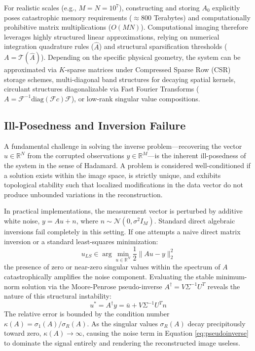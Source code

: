 For realistic scales (e.g., $M = N = 10^7$), constructing and storing $A_0$ explicitly poses catastrophic memory requirements ($\approx 800$ Terabytes) and computationally prohibitive matrix multiplications ($O(MN)$). Computational imaging therefore leverages highly structured linear approximations, relying on numerical integration quadrature rules ($\hat{A}$) and structural sparsification thresholds ($A = \mathcal{T}(\hat{A})$). Depending on the specific physical geometry, the system can be approximated via $K$-sparse matrices under Compressed Sparse Row (CSR) storage schemes, multi-diagonal band structures for decaying spatial kernels, circulant structures diagonalizable via Fast Fourier Transforms ($A = \mathcal{F}^{-1} \text{diag}(\mathcal{F}c)\mathcal{F}$), or low-rank singular value compositions.

\subsection{Ill-Posedness and Inversion Failure}
A fundamental challenge in solving the inverse problem—recovering the vector $u \in \mathbb{R}^N$ from the corrupted observations $y \in \mathbb{R}^M$—is the inherent ill-posedness of the system in the sense of Hadamard. A problem is considered well-conditioned if a solution exists within the image space, is strictly unique, and exhibits topological stability such that localized modifications in the data vector do not produce unbounded variations in the reconstruction. 

In practical implementations, the measurement vector is perturbed by additive white noise, $y = Au + n$, where $n \sim \mathcal{N}(0, \sigma^2 I_M)$. Standard direct algebraic inversions fail completely in this setting. If one attempts a naive direct matrix inversion or a standard least-squares minimization:
\begin{equation}
    u_{LS} \in \arg\min_{u \in \mathbb{R}^N} \frac{1}{2} \|Au - y\|_2^2
\end{equation}
the presence of zero or near-zero singular values within the spectrum of $A$ catastrophically amplifies the noise component. Evaluating the stable minimum-norm solution via the Moore-Penrose pseudo-inverse $A^{\dagger} = V \Sigma^{-1} U^T$ reveals the nature of this structural instability:
\begin{equation}
    u^* = A^{\dagger}y = \bar{u} + V \Sigma^{-1} U^T n
    \label{eq:pseudoinverse}
\end{equation}
The relative error is bounded by the condition number $\kappa(A) = \sigma_1(A) / \sigma_R(A)$. As the singular values $\sigma_R(A)$ decay precipitously toward zero, $\kappa(A) \to \infty$, causing the noise term in Equation \eqref{eq:pseudoinverse} to dominate the signal entirely and rendering the reconstructed image useless.

